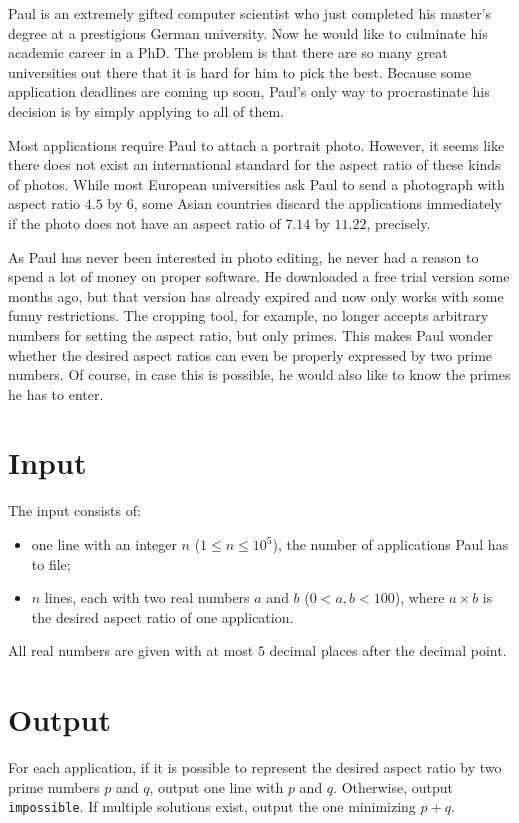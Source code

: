 Paul is an extremely gifted computer scientist who just completed his master's degree at a prestigious German university. Now he would like to culminate his academic career in a PhD. The problem is that there are so many great universities out there that it is hard for him to pick the best. Because some application deadlines are coming up soon, Paul's only way to procrastinate his decision is by simply applying to all of them.

Most applications require Paul to attach a portrait photo. However, it seems like there does not exist an international standard for the aspect ratio of these kinds of photos. While most European universities ask Paul to send a photograph with aspect ratio $4.5$ by $6$, some Asian countries discard the applications immediately if the photo does not have an aspect ratio of $7.14$ by $11.22$, precisely.

As Paul has never been interested in photo editing, he never had a reason to spend a lot of money on proper software. He downloaded a free trial version some months ago, but that version has already expired and now only works with some funny restrictions. The cropping tool, for example, no longer accepts arbitrary numbers for setting the aspect ratio, but only primes. This makes Paul wonder whether the desired aspect ratios can even be properly expressed by two prime numbers. Of course, in case this is possible, he would also like to know the primes he has to enter.

\section*{Input}
The input consists of:
\begin{itemize}
	\item one line with an integer $n$ ($1 \le n \le 10^5$), the number of applications Paul has to file;
  \item $n$ lines, each with two real numbers $a$ and $b$ ($0 < a,b < 100$), where $a \times b$ is the desired aspect ratio of one application.
\end{itemize}
All real numbers are given with at most $5$ decimal places after the decimal point.

\section*{Output}
For each application, if it is possible to represent the desired aspect ratio by two prime numbers $p$ and $q$, output one line with $p$ and $q$. Otherwise, output \texttt{impossible}. If multiple solutions exist, output the one minimizing $p+q$.
